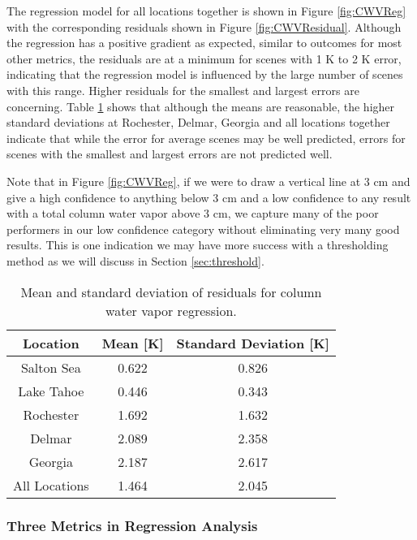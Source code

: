 \documentclass{book}
\begin{document}
The regression model for all locations together is shown in Figure \ref{fig:CWVReg} with the corresponding residuals shown in Figure \ref{fig:CWVResidual}.  Although the regression has a positive gradient as expected, similar to outcomes for most other metrics, the residuals are at a minimum for scenes with 1 K to 2 K error, indicating that the regression model is influenced by the large number of scenes with this range.  Higher residuals for the smallest and largest errors are concerning.  Table \ref{tab:CWVResidual} shows that although the means are reasonable, the higher standard deviations at Rochester, Delmar, Georgia and all locations together indicate that while the error for average scenes may be well predicted, errors for scenes with the smallest and largest errors are not predicted well.

Note that in Figure \ref{fig:CWVReg}, if we were to draw a vertical line at 3 cm and give a high confidence to anything below 3 cm and a low confidence to any result with a total column water vapor above 3 cm, we capture many of the poor performers in our low confidence category without eliminating very many good results.  This is one indication we may have more success with a thresholding method as we will discuss in Section \ref{sec:threshold}.

\begin{table}[H]
\begin{center}
\begin{tabular}{| c | c | c |}
\hline
Location & Mean [K] & Standard Deviation [K] \\ \hline
Salton Sea & 0.622 & 0.826 \\ \hline
Lake Tahoe & 0.446 & 0.343 \\ \hline
Rochester & 1.692 & 1.632 \\ \hline
Delmar & 2.089 & 2.358 \\ \hline
Georgia & 2.187 & 2.617 \\ \hline
All Locations & 1.464 & 2.045 \\ \hline
\end{tabular}
\caption{Mean and standard deviation of residuals for column water vapor regression.}
\label{tab:CWVResidual}
\end{center}
\end{table}

\subsubsection{Three Metrics in Regression Analysis}
\end{document}
